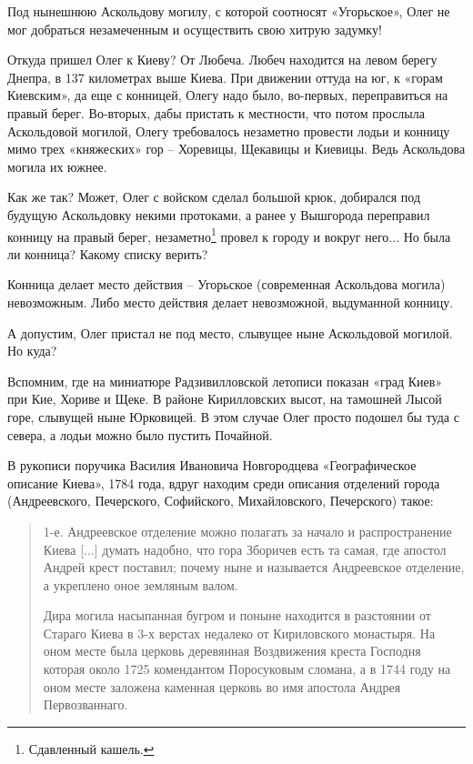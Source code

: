 
Под нынешнюю Аскольдову могилу, с которой соотносят «Угорьское», Олег не мог добраться незамеченным и осуществить свою хитрую задумку! %

Откуда пришел Олег к Киеву? От Любеча. Любеч находится на левом берегу Днепра, в 137 километрах выше Киева. При движении оттуда на юг, к «горам Киевским», да еще с конницей, Олегу надо было, во-первых, переправиться на правый берег. Во-вторых, дабы пристать к местности, что потом прослыла Аскольдовой могилой, Олегу требовалось незаметно провести лодьи и конницу мимо трех «княжеских» гор – Хоревицы, Щекавицы и Киевицы. Ведь Аскольдова могила их южнее.

Как же так? Может, Олег с войском сделал большой крюк, добирался под будущую Аскольдовку некими протоками, а ранее у Вышгорода переправил конницу на правый берег, незаметно\footnote{Сдавленный кашель.} провел к городу и вокруг него... Но была ли конница? Какому списку верить?

Конница делает место действия – Угорьское (современная Аскольдова могила) невозможным. Либо место действия делает невозможной, выдуманной конницу.

А допустим, Олег пристал не под место, слывущее ныне Аскольдовой могилой. Но куда?

Вспомним, где на миниатюре Радзивилловской летописи показан «град Киев» при Кие, Хориве и Щеке. В районе Кирилловских высот, на тамошней Лысой горе, слывущей ныне Юрковицей. В этом случае Олег просто подошел бы туда с севера, а лодьи можно было пустить Почайной.

В рукописи поручика Василия Ивановича Новгородцева «Географическое описание Киева», 1784 года\cite{sbornikmat}, вдруг находим среди описания отделений города (Андреевского, Печерского, Софийского, Михайловского, Печерского) такое:

\begin{quotation}
1-е. Андреевское отделение можно полагать за начало и распространение Киева [...] думать надобно, что гора Зборичев есть та самая, где апостол Андрей крест поставил; почему ныне и называется Андреевское отделение, а укреплено оное земляным валом.

Дира могила насыпанная бугром и поныне находится в разстоянии от Стараго Киева в 3-х верстах недалеко от Кириловского монастыря. На оном месте была церковь деревянная Воздвижения креста Господня которая около 1725 комендантом Поросуковым сломана, а в 1744 году на оном месте заложена  каменная церковь во имя апостола Андрея Первозваннаго.
\end{quotation}

